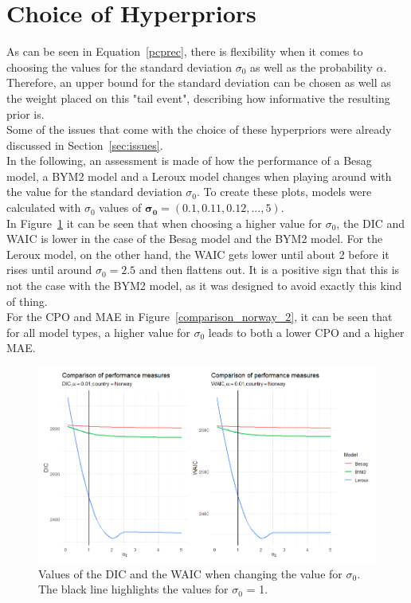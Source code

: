 \section{Choice of Hyperpriors}
As can be seen in Equation~\ref{pcprec}, there is flexibility when it comes to choosing the values for the standard deviation $\sigma_0$ as well as the probability $\alpha$. Therefore, an upper bound for the standard deviation can be chosen as well as the weight placed on this "tail event", describing how informative the resulting prior is. \\
Some of the issues that come with the choice of these hyperpriors were already discussed in Section~\ref{sec:issues}. \\
In the following, an assessment is made of how the performance of a Besag model, a BYM2 model and a Leroux model changes when playing around with the value for the standard deviation $\sigma_0$. To create these plots, models were calculated with $\sigma_0$ values of $\pmb{\sigma_0}=\left(0.1,0.11,0.12,...,5\right)$.\\
In Figure~\ref{comparison_norway_1} it can be seen that when choosing a higher value for $\sigma_0$, the DIC and WAIC is lower in the case of the Besag model and the BYM2 model. For the Leroux model, on the other hand, the WAIC gets lower until about 2 before it rises until around $\sigma_0 = 2.5$ and then flattens out. It is a positive sign that this is not the case with the BYM2 model, as it was designed to avoid exactly this kind of thing. \\
For the CPO and MAE in Figure~\ref{comparison_norway_2}, it can be seen that for all model types, a higher value for $\sigma_0$ leads to both a lower CPO and a higher MAE.
\begin{figure}[H]
  \centering
  \includegraphics[width = \textwidth]{comparison_1_norway.png}
  \caption{Values of the DIC and the WAIC when changing the value for $\sigma_0$. The black line highlights the values for $\sigma_0$ = 1.}
  \label{comparison_norway_1}
\end{figure}
